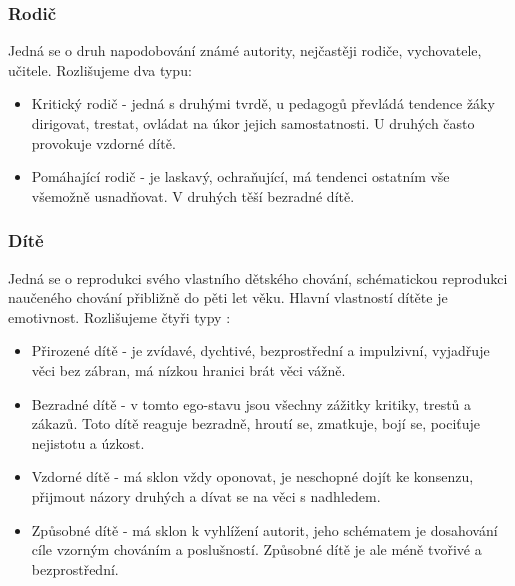    \subsubsection*{Rodič}
    Jedná se o druh napodobování známé autority, nejčastěji rodiče, vychovatele, učitele. Rozlišujeme dva typu\cite{translacni_analyza_prirucka, socialni_psychologie_pro_pedagogy}:
        \begin{itemize}
            \item Kritický rodič - jedná s druhými tvrdě, u pedagogů převládá tendence žáky dirigovat, trestat, ovládat na úkor jejich samostatnosti. U druhých často provokuje vzdorné dítě.
            
            \item Pomáhající rodič - je laskavý, ochraňující, má tendenci ostatním vše všemožně usnadňovat. V druhých těší bezradné dítě.
        \end{itemize}{}
    
        
    \subsubsection*{Dítě}
    Jedná se o reprodukci svého vlastního dětského chování, schématickou reprodukci naučeného chování přibližně do pěti let věku. Hlavní vlastností dítěte je emotivnost. Rozlišujeme  čtyři typy \cite{translacni_analyza_prirucka, socialni_psychologie_pro_pedagogy}:
        \begin{itemize}
            \item Přirozené dítě - je zvídavé, dychtivé, bezprostřední a impulzivní, vyjadřuje věci bez zábran, má nízkou hranici brát věci vážně.
            
            \item Bezradné dítě - v tomto ego-stavu jsou všechny zážitky kritiky, trestů a zákazů. Toto dítě reaguje bezradně, hroutí se, zmatkuje, bojí se, pociťuje nejistotu a úzkost.
            
            \item Vzdorné dítě - má sklon vždy oponovat, je neschopné dojít ke konsenzu, přijmout názory druhých a dívat se na věci s nadhledem.
            
            \item Způsobné dítě - má sklon k vyhlížení autorit, jeho schématem je dosahování cíle vzorným chováním a poslušností. Způsobné dítě je ale méně tvořivé a bezprostřední.
        \end{itemize}{}
    
